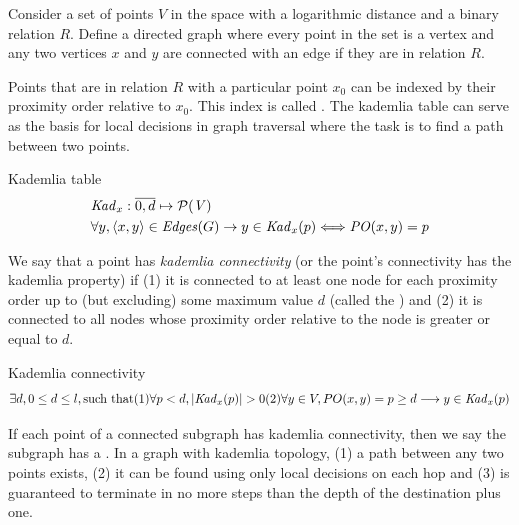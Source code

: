 Consider a set of points $V$ in the space with a logarithmic distance and 
a binary relation $R$. Define a directed graph where every point in the set is a vertex and any two vertices $x$ and $y$ are  connected with an edge if they are in relation $R$. 


Points that are in relation $R$ with a particular point $x_0$ can be indexed by their proximity order relative to $x_0$. This index is called .
The kademlia table can serve as the basis for local decisions in graph traversal where the task is to find a path between two points. 


\begin{definition}{Kademlia table}\label{def:kademlia-table}
\begin{equation}
\begin{split}
&\mathit{Kad}_x: \overline{0,d} \mapsto \mathcal{P}(\mathit{V})\\
&\forall y, \langle x, y \rangle \in \mathit{Edges}(G) \rightarrow y \in \mathit{Kad}_x(p) \Longleftrightarrow \mathit{PO}(x,y)=p 
\end{split}
\end{equation}
\end{definition}

We say that a point has \emph{kademlia connectivity} (or the point's connectivity has  the kademlia property) if (1) it is connected to at least one node for each proximity order up to (but excluding) some maximum value $d$ (called the ) and (2) it is connected to all nodes whose proximity order relative to the node is greater or equal to $d$.

\begin{definition}{Kademlia connectivity}\label{sec:kademlia-connectivity}
\begin{equation}
\exists d, 0\leq d \leq l, \text{such that}
\begin{subequations}
(1)\forall p<d, |\mathit{Kad}_x(p)|>0 \\
(2)\forall y\in V, PO(x,y)=p\geq d \longrightarrow y\in\mathit{Kad}_x(p) 
\end{subequations}
\end{equation}
\end{definition}


If each point of a connected subgraph has kademlia connectivity, then we say the subgraph has a . In a graph with kademlia topology, (1) a path between any two points exists, (2) it can be found using only local decisions on each hop and (3) is guaranteed to terminate in no more steps than the depth of the destination plus one. 

